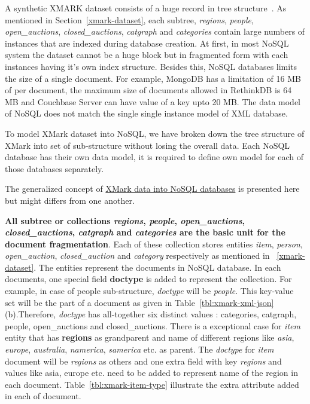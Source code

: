 A synthetic XMARK dataset consists of a huge record in tree structure~\citep{xmark/VIST}. As mentioned in Section~\ref{xmark-dataset}, each subtree, \textit{regions}, \textit{people}, \textit{open\_auctions}, \textit{closed\_auctions}, \textit{catgraph} and \textit{categories} contain large numbers of instances that are indexed during database creation. At first, in most NoSQL system the dataset cannot be a huge block but in fragmented form with each instances having it's own index structure. Besides this, NoSQL databases limits the size of a single document. For example, MongoDB has a limitation of 16 MB of per document, the maximum size of documents allowed in RethinkDB is 64 MB and Couchbase Server can have value of a key upto 20 MB. The data model of NoSQL does not match the single single instance model of XML database.
\par 
To model XMark dataset into NoSQL, we have broken down the tree structure of XMark  into set of sub-structure without losing the overall data. Each NoSQL database has their own data model, it is required to define own model for each of those databases separately.

The generalized concept of \underline {XMark data into NoSQL databases} is presented here  but might differs from one another. 

\textbf{All subtree or collections \textit{regions}, \textit{people}, \textit{open\_auctions}, \textit{closed\_auctions}, \textit{catgraph} and \textit{categories} are the basic unit for the document fragmentation}. Each of these collection stores entities \textit{item}, \textit{person}, \textit{open\_auction}, \textit{closed\_auction} and \textit{category} respectively as mentioned in ~\ref{xmark-dataset}. The entities represent the documents in NoSQL database. In each documents, one special field \textbf{doctype} is added to represent the collection. For example, in case of people sub-structure, \textit{doctype} will be \textit{people}. This key-value set will be the part of a document as  given in Table~\ref{tbl:xmark-xml-json}(b).Therefore, \textit{doctype} has all-together six distinct values : categories, catgraph, people, open\_auctions and closed\_auctions. There is a exceptional case for \textit{item} entity  that has \textbf{regions} as grandparent and name of different regions like \textit{asia}, \textit{europe}, \textit{australia}, \textit{namerica}, \textit{samerica} etc. as parent.  The \textit{doctype} for \textit{item} document will be \textit{regions} as others and one extra field with key \textit{regions} and values like asia, europe etc. need to be added to represent name of the region in each document. Table~\ref{tbl:xmark-item-type} illustrate the extra attribute added in each of document.

